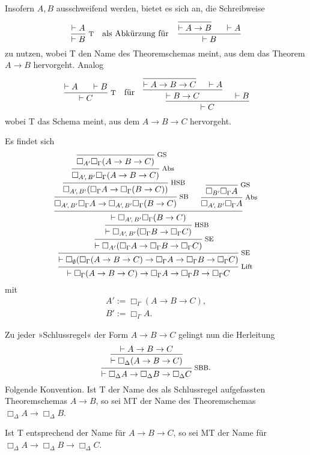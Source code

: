 \documentclass[9pt,fleqn,aspectratio=169]{beamer}
\newcommand{\parspace}{\vspace{0.8em}}
\newcommand{\lnec}{\Box}
\newcommand{\inote}[1]{{\!\footnotesize #1}}
\begin{document}
\begin{frame}
Insofern $A,B$ ausschweifend werden, bietet es sich an, die Schreibweise
\[\dfrac{\vdash A}{\vdash B}\;\text{\footnotesize T}
\quad\text{als Abkürzung für}\quad
\dfrac{\begin{prooftree}[center=false]\infer0{\vdash A\to B}\end{prooftree}\quad\;\;\vdash A}{\vdash B}\]
zu nutzen, wobei T den Name des Theoremschemas meint, aus dem das Theorem
$A\to B$ hervorgeht.\pause{} Analog
\[\dfrac{\vdash A\quad\;\;\vdash B}{\vdash C}\;\text{\footnotesize T}\quad
\text{für}\quad
\begin{prooftree}
    \infer0{\vdash A\to B\to C}
    \hypo{\vdash A}
  \infer2{\vdash B\to C}
  \hypo{\vdash B}
\infer2{\vdash C}
\end{prooftree}\]
wobei T das Schema meint, aus dem $A\to B\to C$ hervorgeht.
\end{frame}

\begin{frame}
Es findet sich
\[\begin{prooftree}
                \infer0[\inote{GS}]{\lnec_{A'} \lnec_\Gamma (A\to B\to C)}
              \infer1[\inote{Abs}]{\lnec_{A'\!,\,B'} \lnec_\Gamma (A\to B\to C)}
            \infer1[\inote{HSB}]{\lnec_{A'\!,\,B'} (\lnec_\Gamma A\to\lnec_\Gamma (B\to C))}
          \infer1[\inote{SB}]{\lnec_{A'\!,\,B'} \lnec_\Gamma A\to\lnec_{A'\!,\,B'}\lnec_\Gamma (B\to C)}
            \infer0[\inote{GS}]{\lnec_{B'} \lnec_\Gamma A}
          \infer1[\inote{Abs}]{\lnec_{A'\!,\,B'} \lnec_\Gamma A}
        \infer2{\vdash\lnec_{A'\!,\,B'}\lnec_\Gamma (B\to C)}
      \infer1[\inote{HSB}]{\vdash\lnec_{A'\!,\,B'}(\lnec_\Gamma B\to\lnec_\Gamma C)}
    \infer1[\inote{SE}]{\vdash\lnec_{A'}(\lnec_\Gamma A\to\lnec_\Gamma B\to\lnec_\Gamma C)}
  \infer1[\inote{SE}]{\vdash\lnec_\emptyset(\lnec_\Gamma (A\to B\to C)\to\lnec_\Gamma A\to\lnec_\Gamma B\to\lnec_\Gamma C)}
\infer1[\inote{Lift}]{\vdash\lnec_\Gamma (A\to B\to C)\to\lnec_\Gamma A\to\lnec_\Gamma B\to\lnec_\Gamma C}
\end{prooftree}\]
mit
\begin{gather*}
A' := \lnec_\Gamma (A\to B\to C),\\
B' := \lnec_\Gamma A.
\end{gather*}
\end{frame}

\begin{frame}
Zu jeder »Schlussregel« der Form $A\to B\to C$ gelingt nun die Herleitung
\[\begin{prooftree}
    \hypo{\vdash A\to B\to C}
  \infer1{\vdash\lnec_\Delta (A\to B\to C)}
\infer1[\inote{SBB}.]{\vdash\lnec_\Delta A\to \lnec_\Delta B\to \lnec_\Delta C}
\end{prooftree}\]\pause
Folgende Konvention. Ist T der Name des als Schlussregel aufgefassten
Theoremschemas $A\to B$, so sei MT der Name des Theoremschemas
$\lnec_\Delta A\to\lnec_\Delta B$.

\parspace
Ist T entsprechend der Name für $A\to B\to C$, so sei MT der Name für
$\lnec_\Delta A\to\lnec_\Delta B\to\lnec_\Delta C$.
\end{frame}
\end{document}
